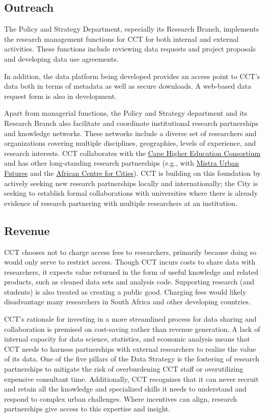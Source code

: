 \documentclass[
]{book}
\begin{document}
\hypertarget{outreach-5}{%
\subsection{Outreach}\label{outreach-5}}

The Policy and Strategy Department, especially its Research Branch, implements the research management functions for CCT for both internal and external activities. These functions include reviewing data requests and project proposals and developing data use agreements.

In addition, the data platform being developed provides an access point to CCT's data both in terms of metadata as well as secure downloads. A web-based data request form is also in development.

Apart from managerial functions, the Policy and Strategy department and its Research Branch also facilitate and coordinate institutional research partnerships and knowledge networks. These networks include a diverse set of researchers and organizations covering multiple disciplines, geographies, levels of experience, and research interests. CCT collaborates with the \href{http://www.chec.ac.za}{Cape Higher Education Consortium} and has other long-standing research partnerships (e.g., with \href{https://www.mistraurbanfutures.org}{Mistra Urban Futures} and the \href{https://www.africancentreforcities.net}{African Centre for Cities}). CCT is building on this foundation by actively seeking new research partnerships locally and internationally; the City is seeking to establish formal collaborations with universities where there is already evidence of research partnering with multiple researchers at an institution.

\hypertarget{revenue-5}{%
\subsection{Revenue}\label{revenue-5}}

CCT chooses not to charge access fees to researchers, primarily because doing so would only serve to restrict access. Though CCT incurs costs to share data with researchers, it expects value returned in the form of useful knowledge and related products, such as cleaned data sets and analysis code. Supporting research (and students) is also treated as creating a public good. Charging fees would likely disadvantage many researchers in South Africa and other developing countries.

CCT's rationale for investing in a more streamlined process for data sharing and collaboration is premised on cost-saving rather than revenue generation. A lack of internal capacity for data science, statistics, and economic analysis means that CCT needs to harness partnerships with external researchers to realize the value of its data. One of the five pillars of the Data Strategy is the fostering of research partnerships to mitigate the risk of overburdening CCT staff or overutilizing expensive consultant time. Additionally, CCT recognizes that it can never recruit and retain all the knowledge and specialized skills it needs to understand and respond to complex urban challenges. Where incentives can align, research partnerships give access to this expertise and insight.
\end{document}
